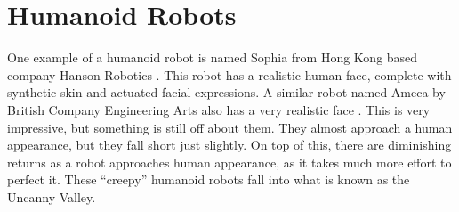 \section{Humanoid Robots}
One example of a humanoid robot is named Sophia from Hong Kong based company Hanson Robotics \cite{hansonroboticslastSophia2023}. This robot has a realistic human face, complete with synthetic skin and actuated facial expressions. A similar robot named Ameca by British Company Engineering Arts also has a very realistic face \cite{engineeredartslastAmeca2023}. This is very impressive, but something is still off about them. They almost approach a human appearance, but they fall short just slightly. On top of this, there are diminishing returns as a robot approaches human appearance, as it takes much more effort to perfect it. These ``creepy'' humanoid robots fall into what is known as the Uncanny Valley.
